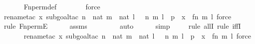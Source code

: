 \begin{isabellebody}
\ \ \ \ \isamarkupfalse%
\ Fn{\isacharunderscore}{\kern0pt}perm{\isacharunderscore}{\kern0pt}def\isanewline
\ \ \ \ \ \ \isamarkupfalse%
\ force\ \isanewline
\ \ \ \ \ \isamarkupfalse%
{\isacharparenleft}{\kern0pt}rename{\isacharunderscore}{\kern0pt}tac\ x{\isacharcomma}{\kern0pt}\ subgoal{\isacharunderscore}{\kern0pt}tac\ {\isachardoublequoteopen}{\isasymexists}n\ {\isasymin}\ nat{\isachardot}{\kern0pt}\ {\isasymexists}m\ {\isasymin}\ nat{\isachardot}{\kern0pt}\ {\isasymexists}l\ {\isasymin}\ {}{\isachardot}{\kern0pt}\ {\isacharless}{\kern0pt}{\isacharless}{\kern0pt}n{\isacharcomma}{\kern0pt}\ m{\isachargreater}{\kern0pt}{\isacharcomma}{\kern0pt}\ l{\isachargreater}{\kern0pt}\ {\isasymin}\ p\ {\isasymand}\ x\ {\isacharequal}{\kern0pt}\ {\isacharless}{\kern0pt}{\isacharless}{\kern0pt}f{\isacharbackquote}{\kern0pt}n{\isacharcomma}{\kern0pt}\ m{\isachargreater}{\kern0pt}{\isacharcomma}{\kern0pt}\ l{\isachargreater}{\kern0pt}{\isachardoublequoteclose}{\isacharcomma}{\kern0pt}\ force{\isacharparenright}{\kern0pt}\isanewline
\ \ \ \ \ \isamarkupfalse%
{\isacharparenleft}{\kern0pt}rule\ Fn{\isacharunderscore}{\kern0pt}permE{\isacharparenright}{\kern0pt}\isanewline
\ \ \ \ \isamarkupfalse%
\ assms\isanewline
\ \ \ \ \ \ \ \isamarkupfalse%
\ auto{\isacharbrackleft}{\kern0pt}{}{\isacharbrackright}{\kern0pt}\isanewline
\ \ \ \ \isamarkupfalse%
\ simp\isanewline
\ \ \ \ \isamarkupfalse%
{\isacharparenleft}{\kern0pt}rule\ allI{\isacharcomma}{\kern0pt}\ rule\ iffI{\isacharparenright}{\kern0pt}\isanewline
\ \ \ \ \ \isamarkupfalse%
{\isacharparenleft}{\kern0pt}rename{\isacharunderscore}{\kern0pt}tac\ x{\isacharcomma}{\kern0pt}\ subgoal{\isacharunderscore}{\kern0pt}tac\ {\isachardoublequoteopen}{\isasymexists}n\ {\isasymin}\ nat{\isachardot}{\kern0pt}\ {\isasymexists}m\ {\isasymin}\ nat{\isachardot}{\kern0pt}\ {\isasymexists}l\ {\isasymin}\ {}{\isachardot}{\kern0pt}\ {\isacharless}{\kern0pt}{\isacharless}{\kern0pt}n{\isacharcomma}{\kern0pt}\ m{\isachargreater}{\kern0pt}{\isacharcomma}{\kern0pt}\ l{\isachargreater}{\kern0pt}\ {\isasymin}\ p\ {\isasymand}\ x\ {\isacharequal}{\kern0pt}\ {\isacharless}{\kern0pt}{\isacharless}{\kern0pt}f{\isacharbackquote}{\kern0pt}n{\isacharcomma}{\kern0pt}\ m{\isachargreater}{\kern0pt}{\isacharcomma}{\kern0pt}\ l{\isachargreater}{\kern0pt}{\isachardoublequoteclose}{\isacharcomma}{\kern0pt}\ force{\isacharparenright}{\kern0pt}\isanewline
\ \ \ \ \ \isamarkupfalse%

\end{isabellebody}
